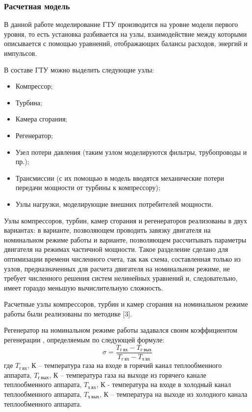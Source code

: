 \subsubsection{Расчетная модель}

В данной работе моделирование ГТУ производится на уровне модели первого уровня, то есть установка разбивается на узлы, взаимодействие между которыми описывается с помощью уравнений, отображающих балансы расходов, энергий и импульсов.

В составе ГТУ можно выделить следующие узлы:
\begin{itemize}
	\item Компрессор;
	\item Турбина;
	\item Камера сгорания;
	\item Регенератор;
	\item Узел потери давления (таким узлом моделируются фильтры, трубопроводы и пр.);
	\item Трансмиссии (с их помощью в модель вводятся механические потери передачи мощности от турбины к компрессору);
	\item Узлы нагрузки, моделирующие внешних потребителей мощности.
\end{itemize}

Узлы компрессоров, турбин, камер сгорания и регенераторов реализованы в двух вариантах: в варианте, позволяющем проводить завязку двигателя на номинальном режиме работы и варианте, позволяющем рассчитывать параметры двигателя на режимах частичной мощности. Такое разделение сделано для оптимизации времени численного счета, так как схема, составленная только из узлов, предназначенных для расчета двигателя на номинальном режиме, не требует численного решения систем нелинейных уравнений и, следовательно, имеет гораздо меньшую вычислительную сложность. 

Расчетные узлы компрессоров, турбин и камер сгорания на номинальном режиме работы были реализованы по методике [3]. 

Регенератор на номинальном режиме работы задавался своим коэффициентом регенерации , определяемым по следующей формуле:
$$
	\sigma = \frac{
		T_{г \ вх} - T_{г \ вых}
	}{
		T_{г \ вх} - T_{х \ вх}
	}
$$
где $T_{г \ вх}$, К – температура газа на входе в горячий канал теплообменного аппарата, $T_{г \ вых}$, К – температура газа на выходе из горячего канале теплообменного аппарата, $T_{х \ вх}$, К - температура на входе в холодный канал теплообменного аппарата, $T_{х \ вых}$, К – температура на выходе из холодного канала теплообменного аппарата.


